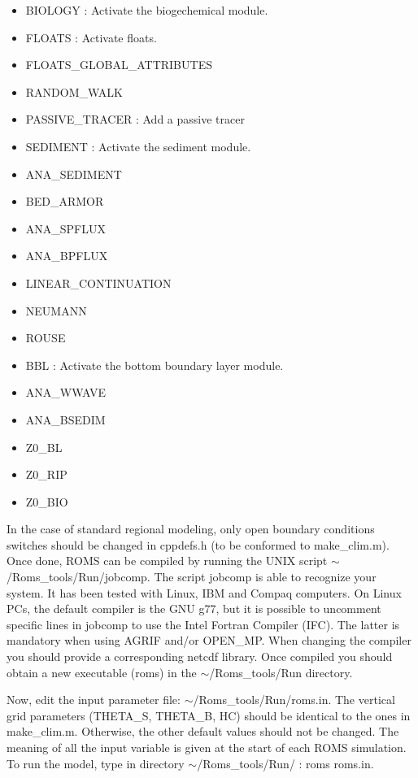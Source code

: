 \begin{itemize}
\item BIOLOGY : Activate the biogechemical module.

\item FLOATS : Activate floats.
\item FLOATS\_GLOBAL\_ATTRIBUTES
\item RANDOM\_WALK

\item PASSIVE\_TRACER : Add a passive tracer

\item SEDIMENT : Activate the sediment module.
\item ANA\_SEDIMENT
\item BED\_ARMOR
\item ANA\_SPFLUX
\item ANA\_BPFLUX
\item LINEAR\_CONTINUATION
\item NEUMANN
\item ROUSE

\item BBL : Activate the bottom boundary layer module.
\item ANA\_WWAVE
\item ANA\_BSEDIM
\item Z0\_BL
\item Z0\_RIP
\item Z0\_BIO

\end{itemize}

In the case of standard regional modeling, only open boundary conditions switches
should be changed in cppdefs.h (to be conformed to make\_clim.m). 
Once done, ROMS can be compiled
by running the UNIX script $\sim$/Roms\_tools/Run/jobcomp.
The script jobcomp is able to recognize your system. It has been tested with 
Linux, IBM and Compaq computers. On Linux PCs, the default compiler is the GNU g77, 
but it is possible to uncomment specific lines in jobcomp to use the Intel Fortran
Compiler (IFC). The latter is mandatory when using AGRIF and/or OPEN\_MP.
When changing the compiler you should provide a corresponding netcdf library.
Once compiled you should obtain a new
executable (roms) in the $\sim$/Roms\_tools/Run directory.

Now, edit the input parameter file: $\sim$/Roms\_tools/Run/roms.in.
The vertical grid parameters (THETA\_S,   THETA\_B,   HC)
should be identical to the ones in make\_clim.m. 
Otherwise, the other default values should not be changed.
The meaning of all the input variable is given at the start of each ROMS
simulation.
To run the model, type in directory $\sim$/Roms\_tools/Run/ : roms roms.in.

